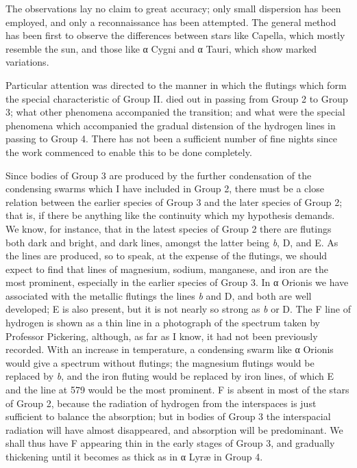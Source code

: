 \documentclass[a4paper, 12pt, oneside, polutonikogreek, english]{article}
\begin{document}
The observations lay no claim to great accuracy; only small dispersion has been employed, and only a reconnaissance has been attempted. The general method has been first to observe the differences between stars like Capella, which mostly resemble the sun, and those like α Cygni and α Tauri, which show marked variations.

Particular attention was directed to the manner in which the flutings which form the special characteristic of Group II. died out in passing from Group 2 to Group 3; what other phenomena accompanied the transition; and what were the special phenomena which accompanied the gradual distension of the hydrogen lines in passing to Group 4. There has not been a sufficient number of fine nights since the work commenced to enable this to be done completely.

Since bodies of Group 3 are produced by the further condensation of the condensing swarms which I have included in Group 2, there must be a close relation between the earlier species of Group 3 and the later species of Group 2; that is, if there be anything like the continuity which my hypothesis demands. We know, for instance, that in the latest species of Group 2 there are flutings both dark and bright, and dark lines, amongst the latter being \emph{b}, D, and E. As the lines are produced, so to speak, at the expense of the flutings, we should expect to find that lines of magnesium, sodium, manganese, and iron are the most prominent, especially in the earlier species of Group 3. In α Orionis we have associated with the metallic flutings the lines \emph{b} and D, and both are well developed; E is also present, but it is not nearly so strong as \emph{b} or D. The F line of hydrogen is shown as a thin line in a photograph of the spectrum taken by Professor Pickering, although, as far as I know, it had not been previously recorded. With an increase in temperature, a condensing swarm like α Orionis would give a spectrum without flutings; the magnesium flutings would be replaced by \emph{b}, and the iron fluting would be replaced by iron lines, of which E and the line at 579 would be the most prominent. F is absent in most of the stars of Group 2, because the radiation of hydrogen from the interspaces is just sufficient to balance the absorption; but in bodies of Group 3 the interspacial radiation will have almost disappeared, and absorption will be predominant. We shall thus have F appearing thin in the early stages of Group 3, and gradually thickening until it becomes as thick as in α Lyræ in Group 4.
\end{document}
